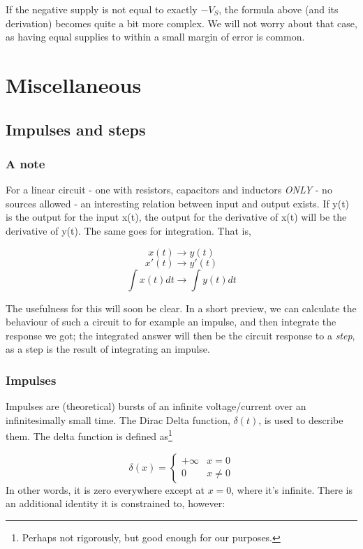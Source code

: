 \documentclass[12pt,a4paper]{report}
\begin{document}
If the negative supply is not equal to exactly $-V_S$, the formula above (and its derivation) becomes quite a bit more complex. We will not worry about that case, as having equal supplies to within a small margin of error is common.



\chapter{Miscellaneous}
\section{Impulses and steps}

\subsection{A note}
For a linear circuit - one with resistors, capacitors and inductors \emph{ONLY} - no sources allowed - an interesting relation between input and output exists. If y(t) is the output for the input x(t), the output for the derivative of x(t) will be the derivative of y(t). The same goes for integration. That is,

\[ x(t) \to y(t) \]
\[ x'(t) \to y'(t) \]
\[ \int x(t) dt \to \int y(t) dt \]

The usefulness for this will soon be clear. In a short preview, we can calculate the behaviour of such a circuit to for example an impulse, and then integrate the response we got; the integrated answer will then be the circuit response to a \emph{step}, as a step is the result of integrating an impulse.

\subsection{Impulses}
Impulses are (theoretical) bursts of an infinite voltage/current over an infinitesimally small time. The Dirac Delta function, $\delta(t)$, is used to describe them. The delta function is defined as\footnote{Perhaps not rigorously, but good enough for our purposes.}

\[ \delta(x) = \begin{cases}
   +\infty & x = 0 \\
   0       & x \neq 0
   \end{cases}
\]
In other words, it is zero everywhere except at $x = 0$, where it's infinite. There is an additional identity it is constrained to, however:
\end{document}
